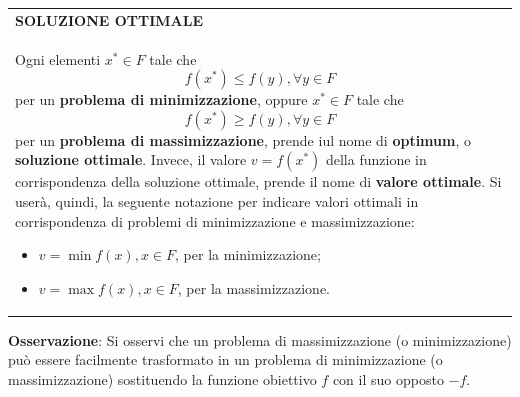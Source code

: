 \documentclass[a4paper]{extarticle}
\renewcommand\arraystretch{}
\begin{document}
\vspace{1em}
\setlength{\tabcolsep}{14pt}
\renewcommand{\arraystretch}{2}
\noindent
\begin{tabularx}{\textwidth}{@{}|P|@{}}
    \hline
    {\textbf{SOLUZIONE OTTIMALE}}\\
    \parbox{\linewidth}{Ogni elementi $x^* \in F$ tale che
    \[f(x^*) \leq f(y), \forall y \in F\]
    per un \textbf{problema di minimizzazione}, oppure $x^* \in F$ tale che
    \[f(x^*) \geq f(y), \forall y \in F\]
    per un \textbf{problema di massimizzazione}, prende iul nome di \textbf{optimum}, o \textbf{soluzione ottimale}.\\
    Invece, il valore $v = f(x^*)$ della funzione in corrispondenza della soluzione ottimale, prende il nome di \textbf{valore ottimale}. Si userà, quindi, la seguente notazione per indicare valori ottimali in corrispondenza di problemi di minimizzazione e massimizzazione:
    \begin{itemize}
        \item $v=\min f(x), x \in F$, per la minimizzazione;
        \item $v=\max f(x), x \in F$, per la massimizzazione.
    \end{itemize}
    \vspace{1mm}}\\
    \hline
\end{tabularx}

\vspace{2em}
\noindent
\textbf{Osservazione}: Si osservi che un problema di massimizzazione (o minimizzazione) può essere facilmente trasformato in un problema di minimizzazione (o massimizzazione) sostituendo la funzione obiettivo $f$ con il suo opposto $-f$.

\vspace{1em}
\noindent
\end{document}
